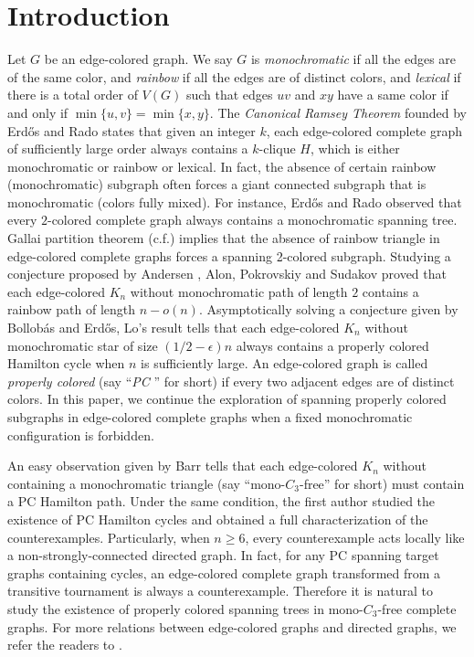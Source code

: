 \documentclass[10pt,a4paper]{article}
\theoremstyle{definition}
\begin{document}
\section{Introduction}
Let $G$ be an edge-colored graph. We say $G$ is {\it monochromatic} if all the edges are of the same color, and {\it rainbow} if all the edges are of distinct colors, and {\it lexical} if there is a total order of $V(G)$ such that edges $uv$ and $xy$ have a same color if and only if $\min\{u,v\}=\min\{x,y\}$. The {\it Canonical Ramsey Theorem} founded by Erd\H{o}s and Rado \cite{erdos_combinatorial_1950} states that given an integer $k$, each edge-colored complete graph of sufficiently large order always contains a $k$-clique $H$, which is either monochromatic or rainbow or lexical. In fact, the absence of certain rainbow (monochromatic) subgraph often forces a giant connected subgraph that is monochromatic (colors fully mixed). For instance, Erd\H{o}s and Rado \cite{erdos_combinatorial_1950} observed that every $2$-colored complete graph always contains a monochromatic spanning tree. Gallai partition theorem \cite{gallai_transitiv_1967}(c.f.\cite{gyarfas_edge_2004}) implies that the absence of rainbow triangle in edge-colored complete graphs forces a spanning 2-colored subgraph.
Studying a conjecture proposed by Andersen \cite{andersen_hamilton_1989}, Alon, Pokrovskiy and Sudakov \cite{alon_random_2017} proved that each edge-colored $K_n$ without monochromatic path of length $2$ contains a rainbow path of length $n-o(n)$. Asymptotically solving a conjecture given by Bollob\'{a}s and Erd\H{o}s\cite{bollobas_alternating_1976}, Lo's result \cite{lo_properly_2016} tells that each edge-colored $K_n$ without monochromatic star of size $(1/2-\epsilon)n$ always contains a properly colored Hamilton cycle when $n$ is sufficiently large. An edge-colored graph is called {\it properly colored} (say ``{\it PC }'' for short) if every two adjacent edges are of distinct colors.
In this paper, we continue the exploration of spanning properly colored subgraphs in edge-colored complete graphs when a fixed monochromatic configuration is forbidden.

An easy observation given by Barr \cite{barr_properly_1998} tells that each edge-colored $K_n$ without containing a monochromatic triangle (say ``mono-$C_3$-free'' for short) must contain a PC Hamilton path. Under the same condition, the first author \cite{li_properly_2021} studied the existence of PC Hamilton cycles and obtained a full characterization of the counterexamples. Particularly, when $n\geq 6$, every counterexample acts locally like a non-strongly-connected directed graph. In fact, for any PC spanning target graphs containing cycles, an edge-colored complete graph transformed from a transitive tournament is always a counterexample. Therefore it is natural to study the existence of properly colored spanning trees in mono-$C_3$-free complete graphs. For more relations between edge-colored graphs and directed graphs, we refer the readers to \cite{fujita_decomposing_2019, li_classification_2020, li_vertexdisjoint_2020, aharoni_rainbow_2019, ding_properly_2022}.
\end{document}
